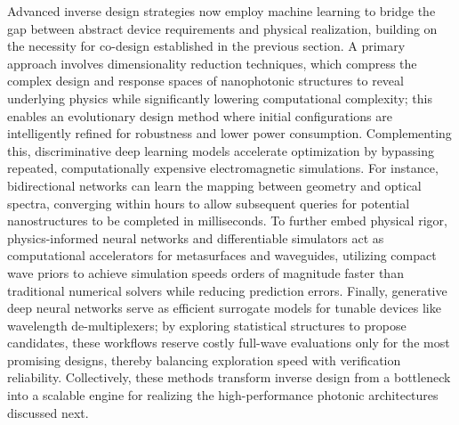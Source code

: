 Advanced inverse design strategies now employ machine learning to bridge the gap between abstract device requirements and physical realization, building on the necessity for co-design established in the previous section. A primary approach involves dimensionality reduction techniques, which compress the complex design and response spaces of nanophotonic structures to reveal underlying physics while significantly lowering computational complexity; this enables an evolutionary design method where initial configurations are intelligently refined for robustness and lower power consumption. Complementing this, discriminative deep learning models accelerate optimization by bypassing repeated, computationally expensive electromagnetic simulations. For instance, bidirectional networks can learn the mapping between geometry and optical spectra, converging within hours to allow subsequent queries for potential nanostructures to be completed in milliseconds. To further embed physical rigor, physics-informed neural networks and differentiable simulators act as computational accelerators for metasurfaces and waveguides, utilizing compact wave priors to achieve simulation speeds orders of magnitude faster than traditional numerical solvers while reducing prediction errors. Finally, generative deep neural networks serve as efficient surrogate models for tunable devices like wavelength de-multiplexers; by exploring statistical structures to propose candidates, these workflows reserve costly full-wave evaluations only for the most promising designs, thereby balancing exploration speed with verification reliability. Collectively, these methods transform inverse design from a bottleneck into a scalable engine for realizing the high-performance photonic architectures discussed next. \citep{doi_10_1117_12_2595199_6f40f1c0} \citep{doi_10_1515_nanoph_2021_0660_2d91a441} \citep{doi_10_48550_arxiv_2209_10098_b3bedb78} \citep{doi_10_1109_access_2026_3697666_bd5258a6}

